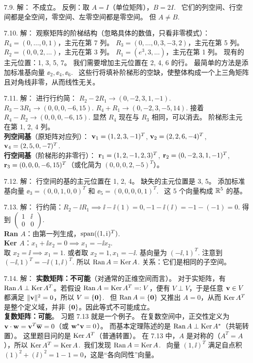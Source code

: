 \begin{exer}
7.9. 解：
不成立。
反例：取 $A = I$（单位矩阵），$B = 2I$.~
它们的列空间、行空间都是全空间，零空间、左零空间都是零空间。
但 $A \neq B$.~

7.10. 解：
观察矩阵的阶梯结构（忽略具体的数值，只看非零模式）：
$R_4 = (0, \dots, 0, 1)$，主元在第 7 列。
$R_3 = (0, \dots, 0, 3, -3, 2)$，主元在第 5 列。
$R_2 = (0, 0, 2, \dots)$，主元在第 3 列。
$R_1 = (e^3, 3, \dots)$，主元在第 1 列。
现有的主元位置：1, 3, 5, 7。
我们需要增加主元位置在 2, 4, 6 的行。
最简单的方法是添加标准基向量 $\ee_2, \ee_4, \ee_6$.~
这些行将填补阶梯形的空缺，使整体构成一个上三角矩阵且对角线非零，从而线性无关。

7.11. 解：
进行行约简：
$R_2 - 2R_1 \to (0, -2, 3, 1, -1)$.
$R_3 - 3R_1 \to (0, 0, 0, -6, 15)$.
$R_4 + R_1 \to (0, -2, 3, -5, 14)$.
接着 $R_4 - R_2 \to (0, 0, 0, -6, 15)$.
显然 $R_4$ 现在与 $R_3$ 相同，可以消去。
阶梯形主元在第 1, 2, 4 列。\\
\textbf{列空间基}（原矩阵对应列）：
$\mathbf{v}_1 = (1, 2, 3, -1)^T$, $\mathbf{v}_2 = (2, 2, 6, -4)^T$, $\mathbf{v}_4 = (2, 5, 0, -7)^T$.\\
\textbf{行空间基}（阶梯形的非零行）：
$\mathbf{r}_1 = (1, 2, -1, 2, 3)^T$, $\mathbf{r}_2 = (0, -2, 3, 1, -1)^T$, $\mathbf{r}_3 = (0, 0, 0, -6, 15)^T$（或化简为 $(0, 0, 0, 2, -5)^T$）。

7.12. 解：
行空间的基的主元位置在 1, 2, 4。
缺失的主元位置是 3, 5。
添加标准基向量 $\ee_3 = (0, 0, 1, 0, 0)^T$ 和 $\ee_5 = (0, 0, 0, 0, 1)^T$.~
这 5 个向量构成 $\mathbb{R}^5$ 的基。

7.13. 解：
行约简：$R_2 - \ii R_1 \implies \ii - \ii(1) = 0, -1 - \ii(\ii) = -1 - (-1) = 0$.
得到 $\begin{pmatrix} 1 & \ii \\ 0 & 0 \end{pmatrix}$.\\
\textbf{Ran $A$}：由第一列生成，$\operatorname{span}((1, \mathrm{i}\mkern1mu)^T)$.\\
\textbf{Ker $A$}：$x_1 + \ii x_2 = 0 \implies x_1 = -\ii x_2$.\\
取 $x_2 = \ii \implies x_1 = 1$. 或者取 $x_2=1, x_1=-\ii$.
基向量为 $(-\ii, 1)^T$.
注意到 $(-\ii, 1)^T = -\ii(1, \ii)^T$.
所以 $\operatorname{Ran} A = \operatorname{Ker} A$.
关系：它们是相同的子空间。

7.14. 解：
\textbf{实数矩阵：不可能}（对通常的正维空间而言）。
对于实矩阵，有 $\operatorname{Ran} A \perp \operatorname{Ker} A^T$。若假设 $\operatorname{Ran} A=\operatorname{Ker} A^T=:V$，便有 $V\perp V$，于是任意 $\mathbf{v}\in V$ 都满足 $\|\mathbf{v}\|^2=0$，所以 $V=\{\mathbf{0}\}$.~
但 $\operatorname{Ran} A=\{\mathbf{0}\}$ 又推出 $A=0$，从而 $\operatorname{Ker} A^T$ 是整个定义域，并非 $\{\mathbf{0}\}$。因此等式不可能成立。
\\
\textbf{复数矩阵：可能}。
习题 7.13 就是一个例子。
在复数空间中，正交性定义为 $\mathbf{v} \cdot \mathbf{w} = \mathbf{v}^T \overline{\mathbf{w}} = 0$（或 $\mathbf{w}^* \mathbf{v} = 0$）。
而基本定理陈述的是 $\operatorname{Ran} A \perp \operatorname{Ker} A^*$（共轭转置）。
这里题目问的是 $\operatorname{Ker} A^T$（普通转置）。
在 7.13 中，$A$ 是对称的（$A^T=A$），所以 $\operatorname{Ker} A^T = \operatorname{Ker} A$.~我们发现 $\operatorname{Ran} A = \operatorname{Ker} A$.~
向量 $(1, \ii)^T$ 满足自点积 $(1)^2 + (\ii)^2 = 1 - 1 = 0$，这是“各向同性”向量。


\end{exer}
